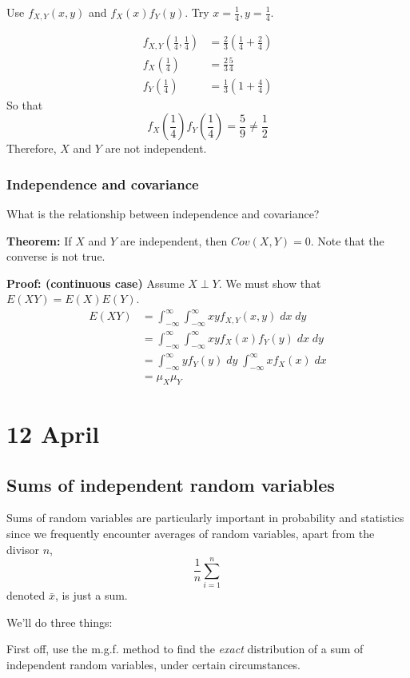 \documentclass[12pt]{article}
\begin{document}
Use $f_{X,Y} (x,y)$ and $f_X (x) f_Y (y)$. Try $x = \frac{1}{4}, y = \frac{1}{4}$.

\begin{align*}
    f_{X,Y} (\frac{1}{4}, \frac{1}{4}) &= \frac{2}{3} (\frac{1}{4} + \frac{2}{4}) \\
    f_X (\frac{1}{4}) &= \frac{2}{3} \frac{5}{4} \\
    f_Y (\frac{1}{4}) &= \frac{1}{3} (1 + \frac{4}{4})
\end{align*}
So that
\[
    f_X (\frac{1}{4}) f_Y (\frac{1}{4}) = \frac{5}{9} \neq \frac{1}{2}
\]
Therefore, $X$ and $Y$ are not independent. 

\subsubsection{Independence and covariance}
What is the relationship between independence and covariance?

\textbf{Theorem:} If $X$ and $Y$ are independent, then $Cov(X,Y) = 0$. Note that the converse is not true.

\textbf{Proof: (continuous case)} Assume $X \perp Y$. We must show that $E(XY) = E(X)E(Y)$.
\begin{align*}
    E(XY) &= \int_{-\infty}^{\infty} \int_{-\infty}^{\infty} x y f_{X,Y} (x,y) \; dx \; dy \\
         &= \int_{-\infty}^{\infty} \int_{-\infty}^{\infty} x y f_X (x) f_Y (y) \; dx \; dy \\
         &= \int_{-\infty}^{\infty} y f_Y (y) \; dy \; \int_{-\infty}^{\infty} x f_X (x) \; dx \\
         &= \mu_X \mu_Y 
\end{align*}

\section{12 April}
\subsection{Sums of independent random variables}
Sums of random variables are particularly important in probability and statistics since we frequently encounter averages of random variables, apart from the divisor $n$, 
\[
    \frac{1}{n} \sum_{i = 1}^n
\]
denoted $\bar{x}$, is just a sum.

We'll do three things:

First off, use the m.g.f. method to find the \emph{exact} distribution of a sum of independent random variables, under certain circumstances. 
\end{document}
